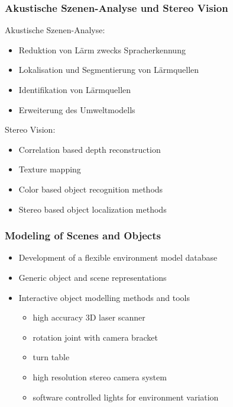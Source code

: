 \subsubsection{Akustische Szenen-Analyse und Stereo Vision}
Akustische Szenen-Analyse:
\begin{itemize}
	\item Reduktion von Lärm zwecks Spracherkennung
	\item Lokalisation und Segmentierung von Lärmquellen
	\item Identifikation von Lärmquellen
	\item Erweiterung des Umweltmodells
\end{itemize}
Stereo Vision:
\begin{itemize}
	\item Correlation based depth reconstruction
	\item Texture mapping
	\item Color based object recognition methods
	\item Stereo based object localization methods
\end{itemize}

\subsubsection{Modeling of Scenes and Objects}
\begin{itemize}
	\item Development of a flexible environment model database
	\item Generic object and scene representations
	\item Interactive object modelling methods and tools
	\begin{itemize}
		\item high accuracy 3D laser scanner
		\item rotation joint with camera bracket
		\item turn table
		\item high resolution stereo camera system
		\item software controlled lights for environment variation
	\end{itemize}
\end{itemize}

